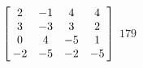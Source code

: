 {$\left[\hskip -3pt \begin{array}{cccc} 2&-1&4&4\\  3&-3&3&2
\\  0&4&-5&1\\  -2&-5&-2&-5\end{array}\hskip -3pt \right]$} 
{$179$}

  

 

